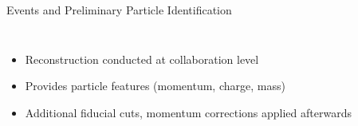 \documentclass[aspectratio=169]{beamer}
\begin{document}
\begin{frame}{Events and Preliminary Particle Identification}
\begin{columns}[t, onlytextwidth]
                    
                \begin{itemize}
                    \item Reconstruction conducted at collaboration level
                    \item Provides particle features (momentum, charge, mass)
                    \item Additional fiducial cuts, momentum corrections applied afterwards
                \end{itemize}
\end{columns}
\end{frame}
\end{document}
